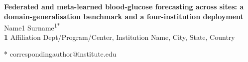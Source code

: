 \documentclass[10pt,letterpaper]{article}
\begin{document}
\vspace*{0.2in}

\begin{flushleft}
{\Large
\textbf{Federated and meta-learned blood-glucose forecasting across sites: a domain-generalisation benchmark and a four-institution deployment}
}
\newline
\\
Name1 Surname\textsuperscript{1*}
\\
\bigskip
\textbf{1} Affiliation Dept/Program/Center, Institution Name, City, State, Country
\\
\bigskip

* correspondingauthor@institute.edu

\end{flushleft}

\end{document}
